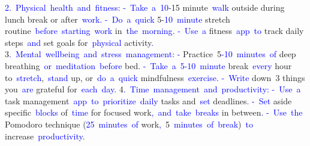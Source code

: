 \documentclass{article}
\begin{document}
\begin{tcolorbox}[colframe=black,colback=white]
{}\textcolor{blue}{2}\textcolor{blue}{.}\textcolor{blue}{~Physical}\textcolor{blue}{~health}\textcolor{blue}{~and}\textcolor{blue}{~fitness}\textcolor{blue}{:
}\textcolor{blue}{-}\textcolor{blue}{~Take}\textcolor{blue}{~a}\textcolor{blue}{~}\textcolor{blue}{10}-15 minute\textcolor{blue}{~walk} outside during lunch break or after\textcolor{blue}{~work}\textcolor{blue}{.
}\textcolor{blue}{-}\textcolor{blue}{~Do}\textcolor{blue}{~a}\textcolor{blue}{~quick} 5-\textcolor{blue}{10}\textcolor{blue}{~minute} stretch routine\textcolor{blue}{~before}\textcolor{blue}{~starting}\textcolor{blue}{~work} in\textcolor{blue}{~the}\textcolor{blue}{~morning}.
\textcolor{blue}{-}\textcolor{blue}{~Use}\textcolor{blue}{~a} fitness\textcolor{blue}{~app}\textcolor{blue}{~to} track daily steps\textcolor{blue}{~and} set goals for\textcolor{blue}{~physical} activity\textcolor{blue}{.
}3\textcolor{blue}{.}\textcolor{blue}{~Mental}\textcolor{blue}{~wellbeing}\textcolor{blue}{~and}\textcolor{blue}{~stress}\textcolor{blue}{~management}\textcolor{blue}{:
}\textcolor{blue}{-} Practice\textcolor{blue}{~}5\textcolor{blue}{-}\textcolor{blue}{10}\textcolor{blue}{~minutes}\textcolor{blue}{~of} deep breathing\textcolor{blue}{~or}\textcolor{blue}{~meditation}\textcolor{blue}{~before} bed.
\textcolor{blue}{-}\textcolor{blue}{~Take}\textcolor{blue}{~a}\textcolor{blue}{~}\textcolor{blue}{5}\textcolor{blue}{-}\textcolor{blue}{10}\textcolor{blue}{~minute} break\textcolor{blue}{~every} hour to\textcolor{blue}{~stretch},\textcolor{blue}{~stand} up, or\textcolor{blue}{~do}\textcolor{blue}{~a}\textcolor{blue}{~quick} mindfulness\textcolor{blue}{~exercise}\textcolor{blue}{.
}\textcolor{blue}{-}\textcolor{blue}{~Write} down\textcolor{blue}{~}3 things you\textcolor{blue}{~are} grateful for\textcolor{blue}{~each}\textcolor{blue}{~day}\textcolor{blue}{.
}4\textcolor{blue}{.}\textcolor{blue}{~Time}\textcolor{blue}{~management}\textcolor{blue}{~and}\textcolor{blue}{~productivity}\textcolor{blue}{:
}\textcolor{blue}{-}\textcolor{blue}{~Use}\textcolor{blue}{~a} task management\textcolor{blue}{~app}\textcolor{blue}{~to}\textcolor{blue}{~prioritize}\textcolor{blue}{~daily} tasks and\textcolor{blue}{~set} deadlines\textcolor{blue}{.
}\textcolor{blue}{-}\textcolor{blue}{~Set} aside specific\textcolor{blue}{~blocks} of\textcolor{blue}{~time} for focused work\textcolor{blue}{,}\textcolor{blue}{~and}\textcolor{blue}{~take}\textcolor{blue}{~breaks} in between\textcolor{blue}{.
}\textcolor{blue}{-}\textcolor{blue}{~Use}\textcolor{blue}{~the} Pomodoro technique (\textcolor{blue}{25}\textcolor{blue}{~minutes}\textcolor{blue}{~of} work\textcolor{blue}{,}\textcolor{blue}{~}5\textcolor{blue}{~minutes}\textcolor{blue}{~of}\textcolor{blue}{~break})\textcolor{blue}{~to} increase\textcolor{blue}{~productivity}.

\end{tcolorbox}
\end{document}
